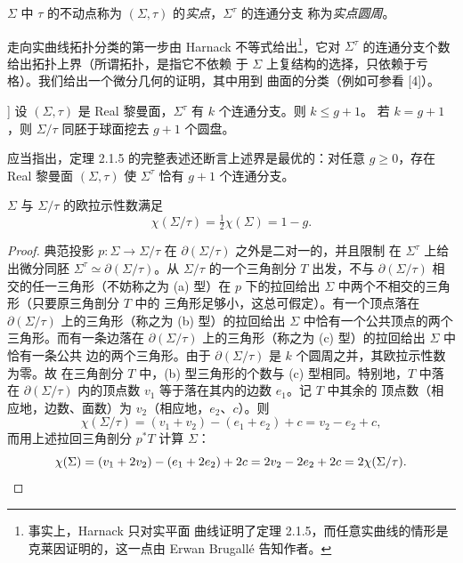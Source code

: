 \begin{definition}\label{def:2.1.4}
$\Sigma$ 中 $\tau$ 的不动点称为 $(\Sigma,\tau)$ 的\emph{实点}，$\Sigma^\tau$ 的连通分支
称为\emph{实点圆周}。
\end{definition}

走向实曲线拓扑分类的第一步由 Harnack 不等式给出\footnote{事实上，Harnack 只对实平面
曲线证明了定理 2.1.5，而任意实曲线的情形是克莱因证明的，这一点由 Erwan Brugallé
告知作者。}，它对 $\Sigma^\tau$ 的连通分支个数给出拓扑上界（所谓拓扑，是指它不依赖
于 $\Sigma$ 上复结构的选择，只依赖于亏格）。我们给出一个微分几何的证明，其中用到
曲面的分类（例如可参看 [4]）。

\begin{theorem}[Harnack 不等式，[7]]\label{thm:2.1.5}
设 $(\Sigma,\tau)$ 是 Real 黎曼面，$\Sigma^\tau$ 有 $k$ 个连通分支。则 $k\le g+1$。
若 $k=g+1$，则 $\Sigma/\tau$ 同胚于球面挖去 $g+1$ 个圆盘。
\end{theorem}

应当指出，定理 2.1.5 的完整表述还断言上述界是最优的：对任意 $g\ge0$，存在 Real
黎曼面 $(\Sigma,\tau)$ 使 $\Sigma^\tau$ 恰有 $g+1$ 个连通分支。

\begin{lemma}\label{lem:2.1.6}
$\Sigma$ 与 $\Sigma/\tau$ 的欧拉示性数满足
\[
\chi(\Sigma/\tau)=\tfrac12\chi(\Sigma)=1-g .
\]
\end{lemma}

\begin{proof}
典范投影 $p:\Sigma\to\Sigma/\tau$ 在 $\partial(\Sigma/\tau)$ 之外是二对一的，并且限制
在 $\Sigma^\tau$ 上给出微分同胚 $\Sigma^\tau\simeq\partial(\Sigma/\tau)$。从 $\Sigma/\tau$
的一个三角剖分 $T$ 出发，不与 $\partial(\Sigma/\tau)$ 相交的任一三角形（不妨称之为
(a) 型）在 $p$ 下的拉回给出 $\Sigma$ 中两个不相交的三角形（只要原三角剖分 $T$ 中的
三角形足够小，这总可假定）。有一个顶点落在 $\partial(\Sigma/\tau)$ 上的三角形（称之为
(b) 型）的拉回给出 $\Sigma$ 中恰有一个公共顶点的两个三角形。而有一条边落在
$\partial(\Sigma/\tau)$ 上的三角形（称之为 (c) 型）的拉回给出 $\Sigma$ 中恰有一条公共
边的两个三角形。由于 $\partial(\Sigma/\tau)$ 是 $k$ 个圆周之并，其欧拉示性数为零。故
在三角剖分 $T$ 中，(b) 型三角形的个数与 (c) 型相同。特别地，$T$ 中落在
$\partial(\Sigma/\tau)$ 内的顶点数 $v_1$ 等于落在其内的边数 $e_1$。记 $T$ 中其余的
顶点数（相应地，边数、面数）为 $v_2$（相应地，$e_2$、$c$）。则
\[
\chi(\Sigma/\tau)=(v_1+v_2)-(e_1+e_2)+c=v_2-e_2+c,
\]
而用上述拉回三角剖分 $p^*T$ 计算 $\Sigma$：
\[
\chi(\Sigma)=(v_1+2v_2)-(e_1+2e_2)+2c=2v_2-2e_2+2c=2\chi(\Sigma/\tau).\qedhere
\]
\end{proof}

